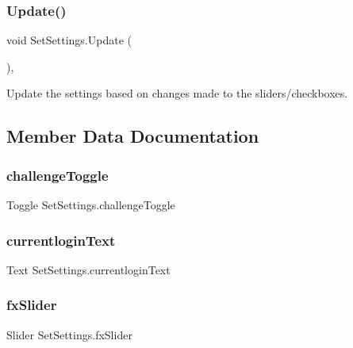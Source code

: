 \subsubsection{\texorpdfstring{Update()}{Update()}}
{\footnotesize\ttfamily void Set\+Settings.\+Update (\begin{DoxyParamCaption}{ }\end{DoxyParamCaption})\hspace{0.3cm}{\ttfamily [inline]}, {\ttfamily [private]}}



Update the settings based on changes made to the sliders/checkboxes. 



\subsection{Member Data Documentation}
\mbox{\label{class_set_settings_aa1d76df5c31261919a7132d81471a7b0}} 
\subsubsection{\texorpdfstring{challengeToggle}{challengeToggle}}
{\footnotesize\ttfamily Toggle Set\+Settings.\+challenge\+Toggle}

\mbox{\label{class_set_settings_a8cb995fa0671cc73dbe7ada21f371e5a}} 
\subsubsection{\texorpdfstring{currentloginText}{currentloginText}}
{\footnotesize\ttfamily Text Set\+Settings.\+currentlogin\+Text}

\mbox{\label{class_set_settings_a22abfb2631badd1928606e7a15dbe310}} 
\subsubsection{\texorpdfstring{fxSlider}{fxSlider}}
{\footnotesize\ttfamily Slider Set\+Settings.\+fx\+Slider\hspace{0.3cm}{\ttfamily [private]}}

